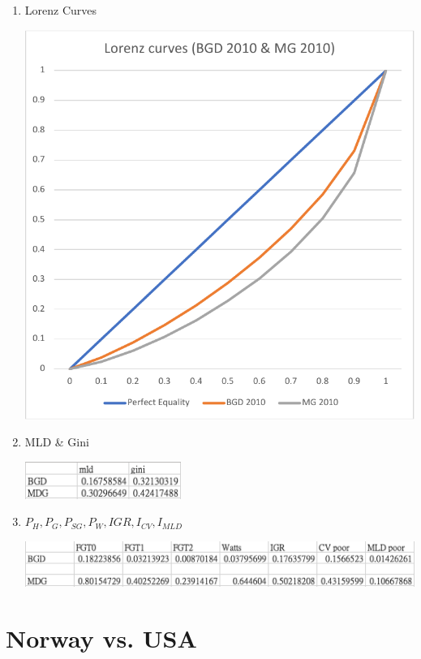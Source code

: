 \documentclass{article}[13pt]
\begin{document}
\begin{enumerate}
    \item{Lorenz Curves}
    
    \includegraphics[width=5in]{lorenzcurve_bgd&mg.pdf}

    \item{MLD \& Gini}
    
    \includegraphics[width=2in]{bdg_mdg_2.png}

    \item{$P_H, P_G, P_{SG}, P_W, IGR, I_{CV}, I_{MLD}$}
    
    \includegraphics[width=5in]{bdg_mdg_1.png}
    
\end{enumerate}

\newpage


\section{Norway vs. USA}
\end{document}
